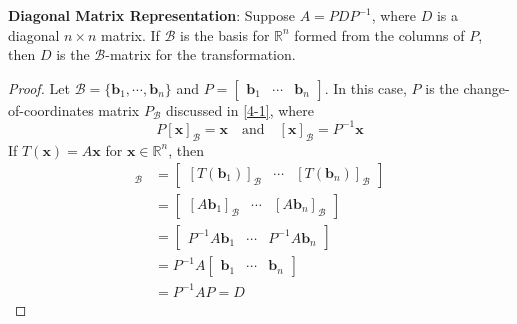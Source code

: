     \begin{Thm}
        \textbf{Diagonal Matrix Representation}:
        Suppose $A = PDP^{-1}$, where $D$ is a diagonal $n\times n$ matrix. If $\mathcal{B}$ is the basis for $\mathbb{R}^n$ formed from the columns of $P$, then $D$ is the $\mathcal{B}$-matrix for the transformation.

        \begin{proof} \label{10-8}
            Let $\mathcal{B} = \{\mathbf{b}_1, \cdots, \mathbf{b}_n\}$ and $P = \begin{bmatrix}
                \mathbf{b}_1 & \cdots & \mathbf{b}_n
            \end{bmatrix}$. In this case, $P$ is the change-of-coordinates matrix $P_{\mathcal{B}}$ discussed in \cref{4-1}, where
            \begin{equation*}
                P[\mathbf{x}]_{\mathcal{B}} = \mathbf{x}\quad \text{and}\quad [\mathbf{x}]_{\mathcal{B}} = P^{-1}\mathbf{x}
            \end{equation*}
            If $T(\mathbf{x}) = A\mathbf{x}$ for $\mathbf{x} \in \mathbb{R}^n$, then
            \begin{align*}
                [T]_{\mathcal{B}} &= \begin{bmatrix}
                    [T(\mathbf{b}_1)]_{\mathcal{B}} & \cdots & [T(\mathbf{b}_n)]_{\mathcal{B}}
                \end{bmatrix}\\
                & = \begin{bmatrix}
                    [A\mathbf{b}_1]_{\mathcal{B}} & \cdots & [A\mathbf{b}_n]_{\mathcal{B}}
                \end{bmatrix}\\
                & = \begin{bmatrix}
                    P^{-1}A\mathbf{b}_1 & \cdots & P^{-1}A\mathbf{b}_n
                \end{bmatrix}\\
                & = P^{-1}A \begin{bmatrix}
                    \mathbf{b}_1 & \cdots & \mathbf{b}_n
                \end{bmatrix}\\
                & = P^{-1}AP = D
            \end{align*}
                 
        \end{proof}
    \end{Thm}

